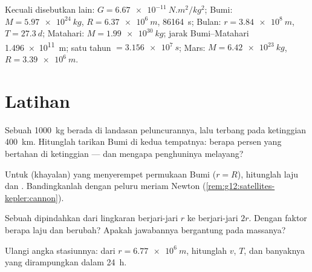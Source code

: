 \begin{remark}\label{rem:g12:satellites-kepler:data}
Kecuali disebutkan lain: $G = \qty{6.67e-11}{N.m^2/kg^2}$; Bumi:
$M = \qty{5.97e24}{kg}$, $R = \qty{6.37e6}{m}$, 
\qty{86164}{s};  Bulan: $r = \qty{3.84e8}{m}$, $T =
\qty{27.3}{d}$; Matahari: $M = \qty{1.99e30}{kg}$; jarak Bumi--Matahari
\qty{1.496e11}{m}; satu tahun $= \qty{3.156e7}{s}$; Mars: $M =
\qty{6.42e23}{kg}$, $R = \qty{3.39e6}{m}$.
\end{remark}

\section{Latihan}

\begin{exercise}[$\star$]\label{exo:g12:satellites-kepler:1}
Sebuah  \qty{1000}{kg} berada di landasan peluncurannya, lalu terbang
pada ketinggian \qty{400}{km}. Hitunglah tarikan Bumi di kedua tempatnya:
berapa persen yang bertahan di ketinggian --- dan mengapa penghuninya melayang?
\end{exercise}

\begin{exercise}[$\star$]\label{exo:g12:satellites-kepler:2}
Untuk  (khayalan) yang menyerempet permukaan Bumi
($r = R$), hitunglah laju  dan . Bandingkanlah dengan peluru
meriam Newton (\cref{rem:g12:satellites-kepler:cannon}).
\end{exercise}

\begin{exercise}[$\star$]\label{exo:g12:satellites-kepler:3}
Sebuah  dipindahkan dari  lingkaran berjari-jari $r$ ke 
berjari-jari $2r$. Dengan faktor berapa laju dan  berubah? Apakah
jawabannya bergantung pada massanya?
\end{exercise}

\begin{exercise}[$\star$]\label{exo:g12:satellites-kepler:4}
Ulangi angka stasiunnya: dari $r = \qty{6.77e6}{m}$, hitunglah
$v$, $T$, dan banyaknya  yang dirampungkan dalam \qty{24}{h}.
\end{exercise}

